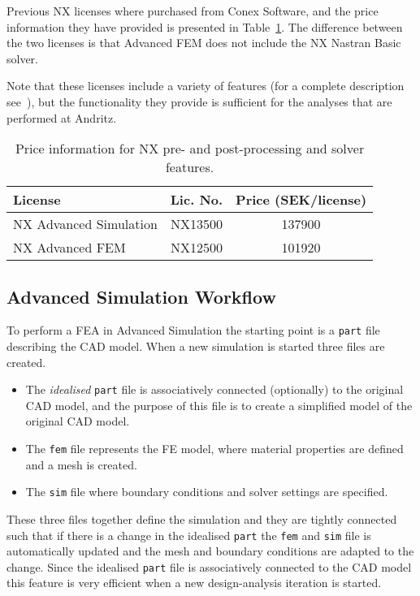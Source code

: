 Previous NX licenses where purchased from Conex Software, and the price information they have provided is presented in Table~\ref{tab:price_information}. The difference between the two licenses is that Advanced FEM does not include the NX Nastran Basic solver.

Note that these licenses include a variety of features (for a complete description see~\cite{siemensnx}), but the functionality they provide is sufficient for the analyses that are performed at Andritz.

\begin{table}[tb]
	\caption{Price information for NX pre- and post-processing and solver features.}
	\label{tab:price_information}
	\begin{center}
		\begin{tabular}{lcc}
		\midrule
		\midrule
		\textbf{License} & \textbf{Lic. No.} & \textbf{Price} (SEK/license) \\
		\midrule
			NX Advanced Simulation & NX13500 & \num{137900} \\
			NX Advanced FEM & NX12500 & \num{101920} \\
		\midrule
		\midrule
		\end{tabular}
	\end{center}
\end{table}

\subsection{Advanced Simulation Workflow} %
\label{sub:advanced_simulation_workflow}
To perform a FEA in Advanced Simulation the starting point is a \texttt{part} file describing the CAD model. When a new simulation is started three files are created.
\begin{itemize}
	\item The \textit{idealised} \texttt{part} file is associatively connected (optionally) to the original CAD model, and the purpose of this file is to create a simplified model of the original CAD model.
	\item The \texttt{fem} file represents the FE model, where material properties are defined and a mesh is created.
	\item The \texttt{sim} file where boundary conditions and solver settings are specified.
\end{itemize}
These three files together define the simulation and they are tightly connected such that if there is a change in the idealised \texttt{part} the \texttt{fem} and \texttt{sim} file is automatically updated and the mesh and boundary conditions are adapted to the change. Since the idealised \texttt{part} file is associatively connected to the CAD model this feature is very efficient when a new design-analysis iteration is started.

